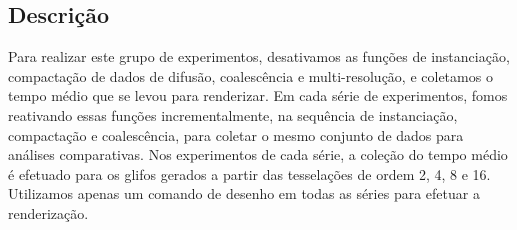 \subsection{Descrição}
\label{ssec:exp1_descricao}


Para realizar este grupo de experimentos, desativamos as funções de instanciação, compactação de dados de difusão, coalescência e multi-resolução, e coletamos o tempo médio que se levou para renderizar. Em cada série de experimentos, fomos reativando essas funções incrementalmente, na sequência de instanciação, compactação e coalescência, para coletar o mesmo conjunto de dados para análises comparativas. Nos experimentos de cada série, a coleção do tempo médio é efetuado para os glifos gerados a partir das tesselações de ordem 2, 4, 8 e 16. Utilizamos apenas um comando de desenho em todas as séries para efetuar a renderização.

